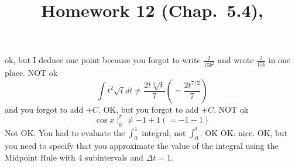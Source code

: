 \documentclass[10pt]{article} %
\title{Homework 12 (Chap.~5.4),
}
\begin{document}
\maketitle
{}
ok, but I deduce one point because you forgot to write $\frac{2}{15b^2}$ and wrote
$\frac{2}{15b}$ in one place.
NOT ok\begin{equation*}
	\int t^2\sqrt{t}dt\neq \frac{2t\sqrt[3]{t}}{7} \left( =\frac{2t^{7/2}}{7} \right)
\end{equation*}
and you forgot to add $+C$.
OK, but you forgot to add $+C$.
NOT ok
\begin{equation*}
	\cos x\mid^{\pi}_0\neq -1+1 \left( =-1-1 \right)
\end{equation*}
Not OK. You had to evaluate the $\int_0^1$ integral, not $\int_0^t$.
OK
OK. nice.
OK, but you need to specify that you approximate the value of the integral using the Midpoint Rule with 4 subintervals and $\Delta t=1$.
\end{document}

